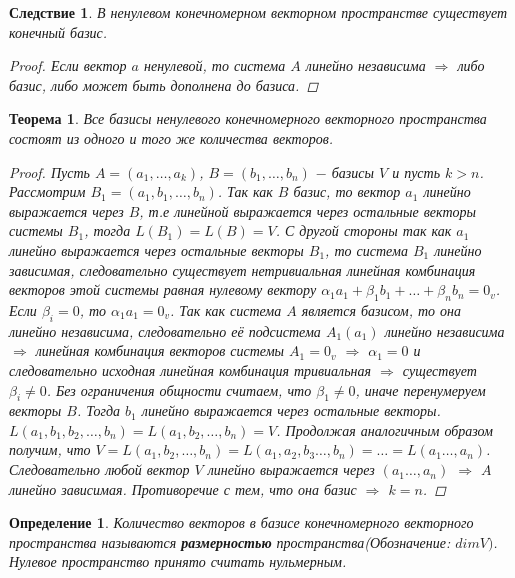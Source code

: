 \documentclass[../../main.tex]{subfiles}
\begin{document}
\newtheorem*{result}{Следствие}
\begin{result}
В ненулевом конечномерном векторном пространстве существует конечный базис.
\begin{proof}
Если вектор $a$ ненулевой, то система $A$ линейно независима $\Rightarrow$ либо базис, либо может быть дополнена до базиса.
\end{proof}
\end{result}


\newtheorem*{t2}{Теорема}
\begin{t2}
Все базисы ненулевого конечномерного векторного пространства состоят из одного и того же количества векторов.
\begin{proof}
Пусть $A = (a_{1},\dots,a_{k})$, $B = (b_{1},\dots,b_{n})$ $-$ базисы $V$ и пусть $k>n$.
Рассмотрим $B_{1} = (a_{1}, b_{1},\dots,b_{n})$. Так как $B$ базис, то вектор $a_{1}$ линейно выражается через $B$, т.е линейной выражается через остальные векторы системы $B_{1}$, тогда $L(B_{1}) = L(B) = V$. С другой стороны так как $a_{1}$ линейно выражается через остальные векторы $B_{1}$, то система $B_{1}$ линейно зависимая, следовательно существует нетривиальная линейная комбинация векторов этой системы равная нулевому вектору 
$\alpha_{1}a_{1} + \beta_{1}b_{1} + \dots + \beta_{n}b_{n} = 0_{v}$. Если $\beta_{i} = 0$, то $\alpha_{1}a_{1} = 0_{v}$. Так как система $A$ является базисом, то она линейно независима, следовательно её подсистема $A_{1}(a_{1})$ линейно независима $\Rightarrow$ линейная комбинация векторов системы $A_{1} = 0_{v}$ $\Rightarrow$ $\alpha_{1} = 0$ и следовательно исходная линейная комбинация тривиальная $\Rightarrow$ существует $\beta_{i} \neq 0$. Без ограничения общности считаем, что $\beta_{1} \neq 0$, иначе перенумеруем векторы $B$. Тогда $b_{1}$ линейно выражается через остальные векторы. $L(a_{1}, b_{1}, b_{2}, \dots, b_{n}) = L(a_{1}, b_{2}, \dots, b_{n}) = V$. Продолжая аналогичным образом получим, что $V = L(a_{1}, b_{2}, \dots, b_{n}) = L(a_{1}, a_{2}, b_{3}\dots,b_{n}) = \dots = L(a_{1}\dots,a_{n})$. Следовательно любой вектор $V$ линейно выражается через $(a_{1}\dots,a_{n})$ $\Rightarrow$ $A$ линейно зависимая. Противоречие с тем, что она базис $\Rightarrow$ $k = n$.
\end{proof}
\end{t2}


\newtheorem*{Definition4}{Определение}
\begin{Definition4}
Количество векторов в базисе конечномерного векторного пространства называются \textbf{размерностью} пространства(Обозначение: $dimV)$. Нулевое пространство принято считать нульмерным.
\end{Definition4}
\end{document}
